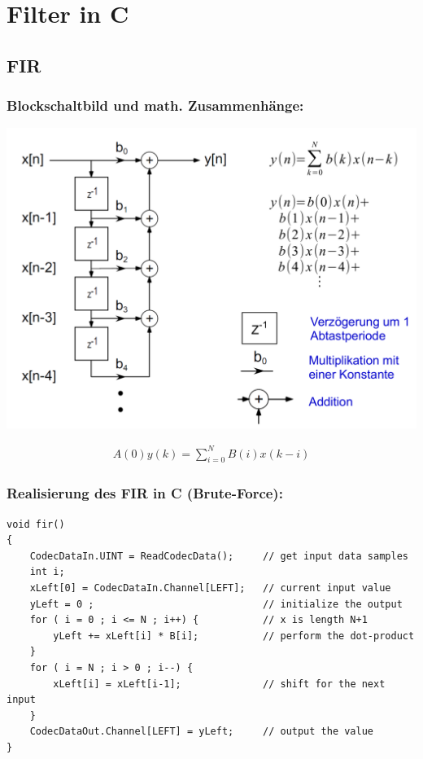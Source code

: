 \documentclass[10pt,a4paper]{article}
\begin{document}
\section{Filter in C}
\subsection{FIR}
\subsubsection{Blockschaltbild und math. Zusammenhänge:}
\begin{center}
  \includegraphics[width=.3\textwidth]{./img/FIR_Blockschaltbild.png}  
\end{center}

  \begin{mdframed}[style=exercise]
    \begin{align}
        A(0)y(k)=\sum_{i=0}^{N} B(i) x(k-i) 
    \end{align}
  \end{mdframed}

\subsubsection{Realisierung des FIR in C (Brute-Force):} 
\begin{verbatim}
void fir()
{
    CodecDataIn.UINT = ReadCodecData();     // get input data samples
    int i;
    xLeft[0] = CodecDataIn.Channel[LEFT];   // current input value
    yLeft = 0 ;                             // initialize the output
    for ( i = 0 ; i <= N ; i++) {           // x is length N+1
        yLeft += xLeft[i] * B[i];           // perform the dot-product
    }
    for ( i = N ; i > 0 ; i--) {
        xLeft[i] = xLeft[i-1];              // shift for the next input
    }
    CodecDataOut.Channel[LEFT] = yLeft;     // output the value
}
\end{verbatim}
\end{document}
